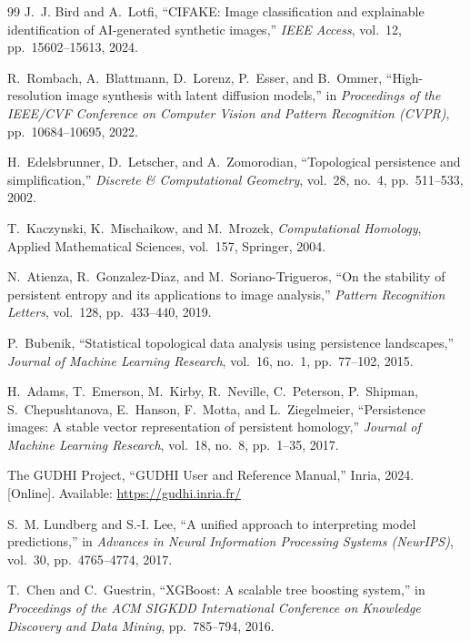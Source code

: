 \documentclass[11pt,a4paper]{article}
\begin{document}
\begin{thebibliography}{99}
J.~J. Bird and A.~Lotfi, ``CIFAKE: Image classification and explainable identification of AI-generated synthetic images,'' \emph{IEEE Access}, vol.~12, pp.~15602--15613, 2024.

R.~Rombach, A.~Blattmann, D.~Lorenz, P.~Esser, and B.~Ommer, ``High-resolution image synthesis with latent diffusion models,'' in \emph{Proceedings of the IEEE/CVF Conference on Computer Vision and Pattern Recognition (CVPR)}, pp.~10684--10695, 2022.

H.~Edelsbrunner, D.~Letscher, and A.~Zomorodian, ``Topological persistence and simplification,'' \emph{Discrete \& Computational Geometry}, vol.~28, no.~4, pp.~511--533, 2002.

T.~Kaczynski, K.~Mischaikow, and M.~Mrozek, \emph{Computational Homology}, Applied Mathematical Sciences, vol.~157, Springer, 2004.

N.~Atienza, R.~Gonzalez-Diaz, and M.~Soriano-Trigueros, ``On the stability of persistent entropy and its applications to image analysis,'' \emph{Pattern Recognition Letters}, vol.~128, pp.~433--440, 2019.

P.~Bubenik, ``Statistical topological data analysis using persistence landscapes,'' \emph{Journal of Machine Learning Research}, vol.~16, no.~1, pp.~77--102, 2015.

H.~Adams, T.~Emerson, M.~Kirby, R.~Neville, C.~Peterson, P.~Shipman, S.~Chepushtanova, E.~Hanson, F.~Motta, and L.~Ziegelmeier, ``Persistence images: A stable vector representation of persistent homology,'' \emph{Journal of Machine Learning Research}, vol.~18, no.~8, pp.~1--35, 2017.

The GUDHI Project, ``GUDHI User and Reference Manual,'' Inria, 2024. [Online]. Available: \url{https://gudhi.inria.fr/}

S.~M. Lundberg and S.-I. Lee, ``A unified approach to interpreting model predictions,'' in \emph{Advances in Neural Information Processing Systems (NeurIPS)}, vol.~30, pp.~4765--4774, 2017.

T.~Chen and C.~Guestrin, ``XGBoost: A scalable tree boosting system,'' in \emph{Proceedings of the ACM SIGKDD International Conference on Knowledge Discovery and Data Mining}, pp.~785--794, 2016.


\end{thebibliography}
\end{document}
